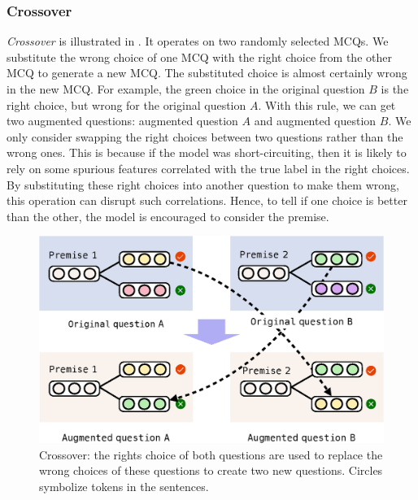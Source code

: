 \subsubsection{Crossover}
\label{sec:crossover}
\textit{Crossover} is illustrated in . It operates 
on two randomly selected MCQs.
We substitute the wrong choice of one MCQ with the right choice from 
the other MCQ to generate a new MCQ. The substituted choice is 
almost certainly wrong in the new MCQ. 
For example, the green choice in the original question $B$ is the right choice, 
but wrong for the original question ${A}$. With this rule, we can get two augmented 
questions: augmented question ${A}$ and augmented question ${B}$.
We only consider swapping the right choices between 
two questions rather than the wrong ones. 
This is because if the model was short-circuiting,
then it is likely to rely on some spurious features correlated with the true
label in the right choices. 
By substituting these right choices into another question to make them wrong, 
this operation can disrupt such correlations.
Hence, to tell if one choice is better than the other, 
the model is encouraged to consider the premise. 
\begin{figure}[th]
        \centering
        \includegraphics[width=0.85\columnwidth]{figure/aug.eps}
        \caption{Crossover: the rights choice of both questions
                are used to replace the wrong choices of these questions to create
                two new questions. Circles symbolize tokens in the sentences.
        } 
        \label{fig:cross}
\end{figure}

